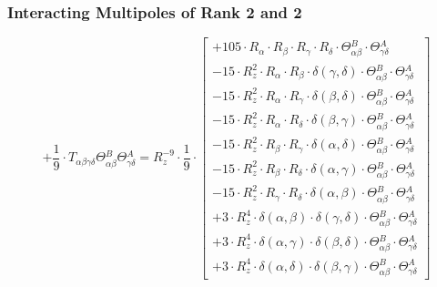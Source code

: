 \documentclass{article}
\begin{document}
\subsubsection{Interacting Multipoles of Rank 2 and 2}
\begin{equation}
+ \frac{1}{9} \cdot T_{\alpha{}\beta{}\gamma{}\delta{}} \Theta{}^{B}_{\alpha{}\beta{}} \Theta{}^{A}_{\gamma{}\delta{}} = R_{z}^{-9} \cdot \frac{1}{9} \cdot  \left[ \begin{array}{c} 
 		+ 105 \cdot R_{\alpha{}} \cdot R_{\beta{}} \cdot R_{\gamma{}} \cdot R_{\delta{}} \cdot \Theta{}^{B}_{\alpha{}\beta{}} \cdot \Theta{}^{A}_{\gamma{}\delta{}} 
 \\[0.2em] 		 - 15 \cdot R_{z}^{2} \cdot R_{\alpha{}} \cdot R_{\beta{}} \cdot \delta{}\left(\gamma{}, \delta{}\right) \cdot \Theta{}^{B}_{\alpha{}\beta{}} \cdot \Theta{}^{A}_{\gamma{}\delta{}} 
 \\[0.2em] 		 - 15 \cdot R_{z}^{2} \cdot R_{\alpha{}} \cdot R_{\gamma{}} \cdot \delta{}\left(\beta{}, \delta{}\right) \cdot \Theta{}^{B}_{\alpha{}\beta{}} \cdot \Theta{}^{A}_{\gamma{}\delta{}} 
 \\[0.2em] 		 - 15 \cdot R_{z}^{2} \cdot R_{\alpha{}} \cdot R_{\delta{}} \cdot \delta{}\left(\beta{}, \gamma{}\right) \cdot \Theta{}^{B}_{\alpha{}\beta{}} \cdot \Theta{}^{A}_{\gamma{}\delta{}} 
 \\[0.2em] 		 - 15 \cdot R_{z}^{2} \cdot R_{\beta{}} \cdot R_{\gamma{}} \cdot \delta{}\left(\alpha{}, \delta{}\right) \cdot \Theta{}^{B}_{\alpha{}\beta{}} \cdot \Theta{}^{A}_{\gamma{}\delta{}} 
 \\[0.2em] 		 - 15 \cdot R_{z}^{2} \cdot R_{\beta{}} \cdot R_{\delta{}} \cdot \delta{}\left(\alpha{}, \gamma{}\right) \cdot \Theta{}^{B}_{\alpha{}\beta{}} \cdot \Theta{}^{A}_{\gamma{}\delta{}} 
 \\[0.2em] 		 - 15 \cdot R_{z}^{2} \cdot R_{\gamma{}} \cdot R_{\delta{}} \cdot \delta{}\left(\alpha{}, \beta{}\right) \cdot \Theta{}^{B}_{\alpha{}\beta{}} \cdot \Theta{}^{A}_{\gamma{}\delta{}} 
 \\[0.2em] 		 + 3 \cdot R_{z}^{4} \cdot \delta{}\left(\alpha{}, \beta{}\right) \cdot \delta{}\left(\gamma{}, \delta{}\right) \cdot \Theta{}^{B}_{\alpha{}\beta{}} \cdot \Theta{}^{A}_{\gamma{}\delta{}} 
 \\[0.2em] 		 + 3 \cdot R_{z}^{4} \cdot \delta{}\left(\alpha{}, \gamma{}\right) \cdot \delta{}\left(\beta{}, \delta{}\right) \cdot \Theta{}^{B}_{\alpha{}\beta{}} \cdot \Theta{}^{A}_{\gamma{}\delta{}} 
 \\[0.2em] 		 + 3 \cdot R_{z}^{4} \cdot \delta{}\left(\alpha{}, \delta{}\right) \cdot \delta{}\left(\beta{}, \gamma{}\right) \cdot \Theta{}^{B}_{\alpha{}\beta{}} \cdot \Theta{}^{A}_{\gamma{}\delta{}}
 \end{array}\right] 
\end{equation}
\end{document}
